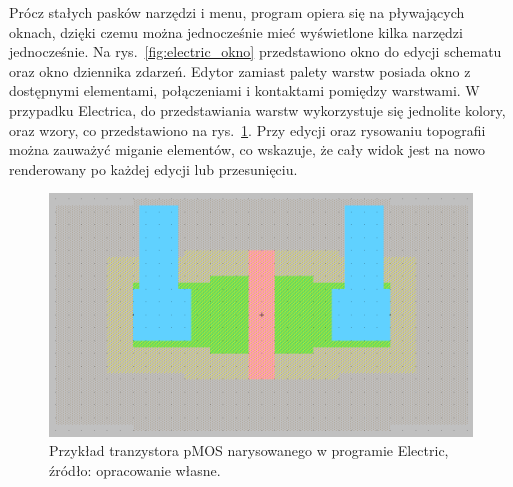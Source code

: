 Prócz stałych pasków narzędzi i menu, program opiera się na pływających oknach,
dzięki czemu można jednocześnie mieć wyświetlone kilka narzędzi jednocześnie.
Na rys.~\ref{fig:electric_okno} przedstawiono okno do edycji schematu oraz okno dziennika zdarzeń.
Edytor zamiast palety warstw posiada okno z dostępnymi elementami, połączeniami i kontaktami pomiędzy warstwami.
W przypadku Electrica, do przedstawiania warstw wykorzystuje się jednolite kolory, oraz wzory,
co przedstawiono na rys.~\ref{fig:electric_tran}.
Przy edycji oraz rysowaniu topografii można zauważyć miganie elementów,
co wskazuje, że cały widok jest na nowo renderowany po każdej edycji lub przesunięciu.

\begin{figure}[h]
    \centering
    \includegraphics[width=.9\textwidth]{chapters/chapter2/img/electric_tran}
    \caption[Przykład tranzystora pMOS narysowanego w programie Electric]
    {
        Przykład tranzystora pMOS narysowanego w programie Electric,
        źródło: opracowanie własne.
    }
    \label{fig:electric_tran}
\end{figure}
